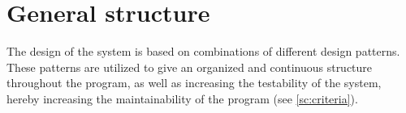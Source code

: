 \section{General structure}
The design of the system is based on combinations of different design patterns. These patterns are utilized to give an organized and continuous structure throughout the program, as well as increasing the testability of the system, hereby increasing the maintainability of the program (see \autoref{sc:criteria}).